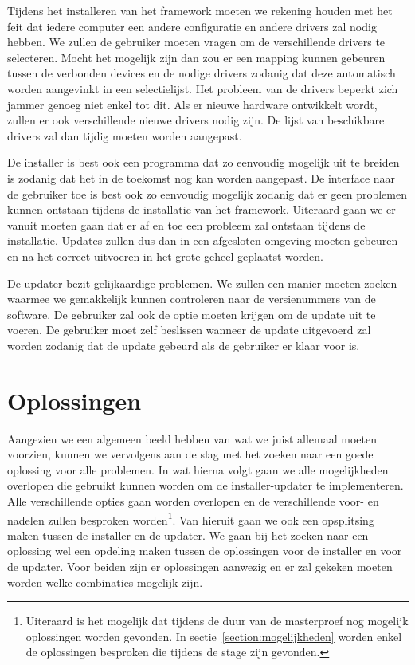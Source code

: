 \documentclass{article}
\begin{document}
Tijdens het installeren van het framework moeten we rekening houden met het feit dat iedere computer een andere configuratie en andere drivers zal nodig hebben.
We zullen de gebruiker moeten vragen om de verschillende drivers te selecteren.
Mocht het mogelijk zijn dan zou er een mapping kunnen gebeuren tussen de verbonden devices en de nodige drivers zodanig dat deze automatisch worden aangevinkt in een selectielijst.
Het probleem van de drivers beperkt zich jammer genoeg niet enkel tot dit.
Als er nieuwe hardware ontwikkelt wordt, zullen er ook verschillende nieuwe drivers nodig zijn.
De lijst van beschikbare drivers zal dan tijdig moeten worden aangepast.

De installer is best ook een programma dat zo eenvoudig mogelijk uit te breiden is zodanig dat het in de toekomst nog kan worden aangepast. 
De interface naar de gebruiker toe is best ook zo eenvoudig mogelijk zodanig dat er geen problemen kunnen ontstaan tijdens de installatie van het framework.
Uiteraard gaan we er vanuit moeten gaan dat er af en toe een probleem zal ontstaan tijdens de installatie.
Updates zullen dus dan in een afgesloten omgeving moeten gebeuren en na het correct uitvoeren in het grote geheel geplaatst worden.

De updater bezit gelijkaardige problemen.
We zullen een manier moeten zoeken waarmee we gemakkelijk kunnen controleren naar de versienummers van de software.
De gebruiker zal ook de optie moeten krijgen om de update uit te voeren.
De gebruiker moet zelf beslissen wanneer de update uitgevoerd zal worden zodanig dat de update gebeurd als de gebruiker er klaar voor is.

\section{Oplossingen}
Aangezien we een algemeen beeld hebben van wat we juist allemaal moeten voorzien, kunnen we vervolgens aan de slag met het zoeken naar een goede oplossing voor alle problemen.
In wat hierna volgt gaan we alle mogelijkheden overlopen die gebruikt kunnen worden om de installer-updater te implementeren.
Alle verschillende opties gaan worden overlopen en de verschillende voor- en nadelen zullen besproken worden\footnote{Uiteraard is het mogelijk dat tijdens de duur van de masterproef nog mogelijk oplossingen worden gevonden.
In sectie~\vref{section:mogelijkheden} worden enkel de oplossingen besproken die tijdens de stage zijn gevonden.}.
Van hieruit gaan we ook een opsplitsing maken tussen de installer en de updater.
We gaan bij het zoeken naar een oplossing wel een opdeling maken tussen de oplossingen voor de installer en voor de updater.
Voor beiden zijn er oplossingen aanwezig en er zal gekeken moeten worden welke combinaties mogelijk zijn.
\end{document}
